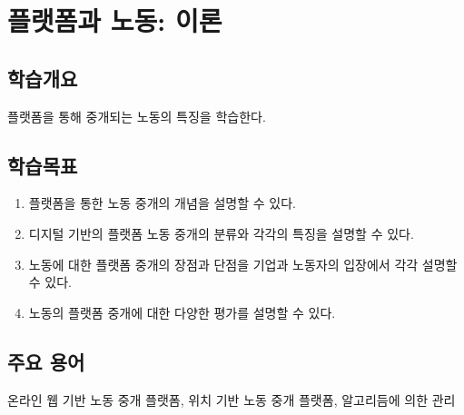 \chapter{플랫폼과 노동: 이론}\label{cha:platforminlabormarket}

\section*{학습개요}
플랫폼을 통해 중개되는 노동의 특징을 학습한다.

\section*{학습목표}
\begin{enumerate}
\item 플랫폼을 통한 노동 중개의 개념을 설명할 수 있다.
\item 디지털 기반의 플랫폼 노동 중개의 분류와 각각의 특징을 설명할 수 있다.
\item 노동에 대한 플랫폼 중개의 장점과 단점을 기업과 노동자의 입장에서 각각 설명할 수 있다.
\item 노동의 플랫폼 중개에 대한 다양한 평가를 설명할 수 있다.
\end{enumerate}

\section*{주요 용어}
온라인 웹 기반 노동 중개 플랫폼, 위치 기반 노동 중개 플랫폼, 알고리듬에 의한 관리

\pagebreak

